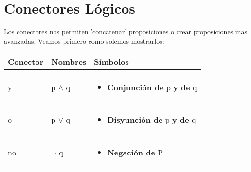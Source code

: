 \documentclass[12pt]{report}                                    %
\begin{document}
    \section{Conectores Lógicos}

        Los conectores nos permiten 'concatenar' proposiciones o crear proposiciones mas avanzadas. 
        Veamos primero como solemos mostrarlos:

        \begin{longtable}{p{35mm} || p{30mm} || p{80mm}}

            \textbf{\large Conector}
            &
            \textbf{\large Nombres}
            &
            \textbf{\large Símbolos}
            \\[1.5ex]
            \hline\hline
            & & \\                                                                    
            \endhead                                                     

            \large y  &  \large{p $\land$ q}                                    &

            \begin{minipage}[t]{\textwidth}\begin{itemize}
                \item \textbf{Conjunción de} p \textbf{y de} q
            \end{itemize}\end{minipage}                                         \\[1.5ex]
            
            \hline & & \\ \large o  &  \large{p $\lor$ q}                       &
            
            \begin{minipage}[t]{\textwidth}\begin{itemize}
                \item \textbf{Disyunción de} p \textbf{y de} q
            \end{itemize}\end{minipage}                                         \\[1.5ex]


            \hline & & \\ \large no  &  \large{$\lnot$ q}                       &

            \begin{minipage}[t]{\textwidth}\begin{itemize}
                \item \textbf{Negación de} P
            \end{itemize}\end{minipage}                                         \\[1.5ex]


\end{longtable}
\end{document}

